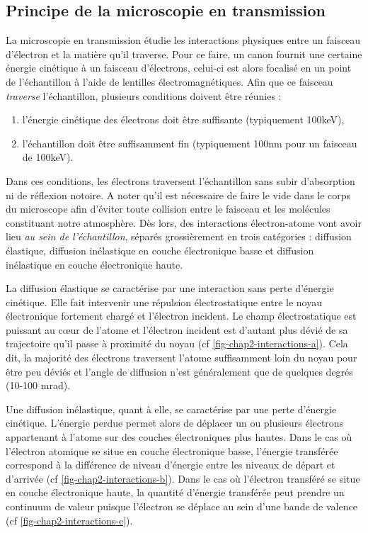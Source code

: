     \subsection{Principe de la microscopie en transmission}

    La microscopie en transmission étudie les interactions physiques entre un faisceau d'électron et la matière qu'il traverse. Pour ce faire, un canon fournit une certaine énergie cinétique à un faisceau d'électrons, celui-ci est alors focalisé en un point de l'échantillon à l'aide de lentilles électromagnétiques. Afin que ce faisceau \emph{traverse} l'échantillon, plusieurs conditions doivent être réunies :
    \begin{enumerate}[label=(\alph*)]
    	\item l'énergie cinétique des électrons doit être suffisante (typiquement 100keV),
    	\item l'échantillon doit être suffisamment fin (typiquement 100nm pour un faisceau de 100keV).
    \end{enumerate}
    Dans ces conditions, les électrons traversent l'échantillon sans subir d'absorption ni de réflexion notoire. A noter qu'il est nécessaire de faire le vide dans le corps du microscope afin d'éviter toute collision entre le faisceau et les molécules constituant notre atmosphère. Dès lors, des interactions électron-atome vont avoir lieu \emph{au sein de l'échantillon}, séparés grossièrement en trois catégories : diffusion élastique, diffusion inélastique en couche électronique basse et diffusion inélastique en couche électronique haute.

    La diffusion élastique se caractérise par une interaction sans perte d'énergie cinétique. Elle fait intervenir une répulsion électrostatique entre le noyau électronique fortement chargé et l'électron incident. Le champ électrostatique est puissant au c\oe{}ur de l'atome et l'électron incident est d'autant plus dévié de sa trajectoire qu'il passe à proximité du noyau (cf \cref{fig-chap2-interactions-a}). Cela dit, la majorité des électrons traversent l'atome suffisamment loin du noyau pour être peu déviés et l'angle de diffusion n'est généralement que de quelques degrés (10-100 mrad).

    Une diffusion inélastique, quant à elle, se caractérise par une perte d'énergie cinétique. L'énergie perdue permet alors de déplacer un ou plusieurs électrons appartenant à l'atome sur des couches électroniques plus hautes. Dans le cas où l'électron atomique se situe en couche électronique basse, l'énergie transférée correspond à la différence de niveau d'énergie entre les niveaux de départ et d'arrivée (cf \cref{fig-chap2-interactions-b}). Dans le cas où l'électron transféré se situe en couche électronique haute, la quantité d'énergie transférée peut prendre un continuum de valeur puisque l'électron se déplace au sein d'une bande de valence (cf \cref{fig-chap2-interactions-c}).

